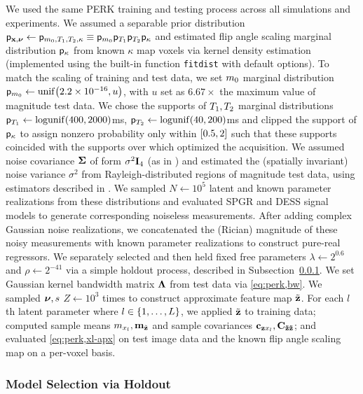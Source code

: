 We used the same PERK training and testing process
across all simulations and experiments.
We assumed a separable prior distribution
$\mathsf{p}_{\mathbf{x},\boldsymbol{\nu}} \gets \mathsf{p}_{m_0,T_1,T_2,\kappa} 
	\equiv \mathsf{p}_{m_0}\mathsf{p}_{T_1}\mathsf{p}_{T_2}\mathsf{p}_{\kappa}$
and estimated flip angle scaling marginal distribution $\mathsf{p}_{\kappa}$
from known $\kappa$ map voxels
via kernel density estimation 
(implemented using 
the built-in \matlab function \texttt{fitdist}
with default options).
To match the scaling of training and test data,
we set $m_0$ marginal distribution 
$\dist{\mzero} \gets \unif{2.2\times10^{-16},u}$,
with $u$ set as $6.67\times$ the maximum value
of magnitude test data.
We chose the supports 
of $T_1,T_2$ marginal distributions 
$\dist{\To} \gets \logunif{400,2000}$ms,
$\dist{\Tt} \gets \logunif{40,200}$ms
and clipped the support 
of $\mathsf{p}_{\kappa}$
to assign nonzero probability
only within $\brac{0.5,2}$
such that these supports 
coincided with the supports 
over which \cite{nataraj:17:oms} 
optimized the acquisition.
We assumed noise covariance $\boldsymbol{\Sigma}$ 
of form $\sigma^2 \mathbf{I}_{4}$ 
(as in \cite{nataraj:17:oms})
and estimated the 
(spatially invariant) noise variance $\sigma^2$
from Rayleigh-distributed regions 
of magnitude test data,
using estimators described in \cite{siddiqui:64:sif}.
We sampled $N \gets 10^5$ 
latent and known parameter realizations
from these distributions
and evaluated SPGR and DESS signal models
to generate corresponding noiseless measurements.
After adding complex Gaussian noise realizations,
we concatenated the (Rician) magnitude 
of these noisy measurements
with known parameter realizations
to construct pure-real regressors. 
We separately selected and then held fixed 
free parameters $\lambda \gets 2^{0.6}$ 
and $\rho \gets 2^{-41}$
via a simple holdout process,
described in Subsection~\ref{sss,perk,exp,meth,holdout}.
We set Gaussian kernel bandwidth matrix $\boldsymbol{\Lambda}$ 
from test data via \eqref{eq:perk,bw}.
We sampled $\boldsymbol{\nu},s$ $Z \gets 10^3$ times 
to construct approximate feature map $\tilde{\mathbf{z}}$. 
For each $l$th latent parameter
where $l \in \set{1,\dots,L}$,
we applied $\tilde{\mathbf{z}}$ to training data;
computed sample means $m_{x_l}, \mathbf{m}_{\tilde{\mathbf{z}}}$ 
and sample covariances $\mathbf{c}_{\mathbf{z} x_l}, \mathbf{C_{\tilde{\mathbf{z}}\tilde{\mathbf{z}}}}$;
and evaluated \eqref{eq:perk,xl-apx}
on test image data 
and the known flip angle scaling map
on a per-voxel basis. 

\subsubsection{Model Selection via Holdout}
\label{sss,perk,exp,meth,holdout}

